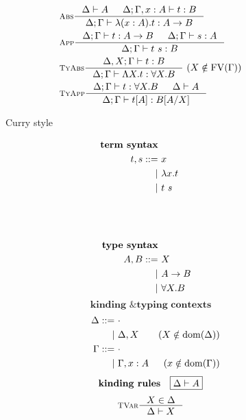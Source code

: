 \begin{figure}
\begin{singlespace}
\begin{minipage}{.46\textwidth}
\begin{align*}
& \inference[\sc Abs]{\Delta |- A & \Delta;\Gamma,x:A |- t : B}
                     {\Delta;\Gamma |- \l(x:A).t : A -> B} \\
& \inference[\sc App]{\Delta;\Gamma |- t : A -> B & \Delta;\Gamma |- s : A}
                     {\Delta;\Gamma |- t~s : B} \\
& \inference[\sc TyAbs]{\Delta,X;\Gamma |- t : B}
                       {\Delta;\Gamma |- \L X.t : \forall X.B} ~
                       (X\notin\FV(\Gamma)) \\
& \inference[\sc TyApp]{\Delta;\Gamma |- t : \forall X.B & \Delta |- A}
                       {\Delta;\Gamma |- t[A] : B[A/X]}
\end{align*}
\end{minipage}
\begin{minipage}{.46\textwidth}
        \begin{center}Curry style\end{center}
\def\baselinestretch{0}
\small
\begin{align*}
\textbf{term syntax} \\
t,s ::= &~ x           \\
      | &~ \l x    . t \\
      | &~ t ~ s       \\
        &~\phantom{| \L X}  \\
        &~\phantom{| t [A]\vspace*{.1em}} \\
\\
\textbf{type syntax} \\
A,B ::= &~ X \\
      | &~ A -> B \\
      | &~ \forall X . B \\
\end{align*}
\[ \textbf{kinding \& typing contexts} \]\vspace*{-1em}
\begin{align*}\quad
\Delta ::= &~ \cdot \\
         | &~ \Delta, X & (X\notin \mathop{\mathrm{dom}}(\Delta)) \\
\Gamma ::= &~ \cdot \\
         | &~ \Gamma, x:A & (x\notin \mathop{\mathrm{dom}}(\Gamma)) \\
\end{align*}
\[ \textbf{kinding rules} \quad \framebox{$ \Delta |- A $}\]\vspace*{-1em}
\begin{align*}
& \inference[\sc TVar]{X \in \Delta}{\Delta |- X} \\

\end{align*}
\end{minipage}
\end{singlespace}
\end{figure}
